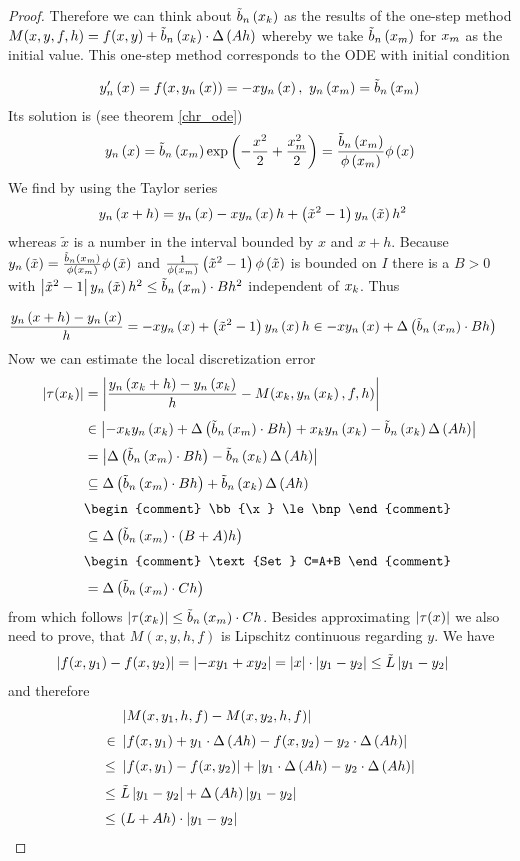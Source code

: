 \begin{proof}
  Therefore we can think about $\bb{\x}$ as the results of the one-step method $M(x,y,f,h)=f(x,y)+\bb{\x} \cdot \bigabs{A h}$ whereby we take $\bnp$ for $\xnp$ as the initial value. This one-step method corresponds to the ODE with initial condition

  \begin{align}
    \dphin{x}=f(x,\phin{x})=-x\phin{x},\ \phin{\xnp} = \bb{\xnp}
  \end{align}
  Its solution is (see theorem \ref{chr_ode})
  \begin{align}
    \phin{x} = \bb{\xnp}\fexp{-\frac{x^2}2+\frac{\xnp^2}2} = \frac{\bb{\xnp}}{\fphi{\xnp}} \fphi{x}
  \end{align}
  We find by using the Taylor series
  \begin{align}
    & \phin{x+h} = \phin{x} -x\phin{x}h+\br{\tilde x^2-1}\phin{\tilde x} h^2
  \end{align}
  whereas $\tilde x$ is a number in the interval bounded by $x$ and $x+h$. Because $\phin{\tilde x} = \frac{\bnp}{\fphi{\xnp}} \fphi{\tilde x}$ and $\frac{1}{\fphi{\xnp}} \br{\tilde x^2-1} \fphi{\tilde x}$ is bounded on $I$ there is a $B > 0$ with $\abs{\tilde x^2-1} \phin{\tilde x} h^2 \le \bnp \cdot B h^2$ independent of $\x[k]$. Thus

  \begin{align}
    \frac{\phin{x+h}-\phin{x}}h &= -x\phin{x}+\br{\tilde x^2-1}\phin{x} h \in -x\phin{x} + \bigabs{\bnp \cdot Bh}
  \end{align}
  Now we can estimate the local discretization error
  \begin{align}
    \abs{\tau(\x)} &= \abs{\frac{\phin{\x[k]+h}-\phin{\x}}h -  M(\x,\phin{\x},f,h)} \nl
    &\in \abs{-\x\phin{\x} + \bigabs{\bnp \cdot Bh} +\x\phin{\x} - \bb{\x} \bigabs{Ah}} \nl
    &= \abs{\bigabs{\bnp \cdot Bh}-\bb{\x} \bigabs{Ah}} \nl
    &\subseteq \bigabs{\bnp \cdot Bh}+ \bb{\x} \bigabs{Ah} \nl
    &
    \begin{comment}
      \bb{\x} \le \bnp
    \end{comment} \nl
    &\subseteq \bigabs{\bnp \cdot (B+A)h} \nl
    &
    \begin{comment}
      \text{Set } C=A+B
    \end{comment} \nl
    &= \bigabs{\bnp \cdot Ch}
  \end{align}
  from which follows $\abs{\tau(\x)} \le \bnp \cdot Ch$. Besides approximating $\abs{\tau(x)}$ we also need to prove, that $M(x,y,h,f)$ is Lipschitz continuous regarding $y$. We have
  \begin{align}
    \abs{f(x,y_1)-f(x,y_2)} &= \abs{-xy_1+xy_2} = \abs{x} \cdot \abs{y_1-y_2} \le \Lt \abs{y_1-y_2}
  \end{align}
  and therefore
  \begin{align}
    & \abs{M(x,y_1,h,f)-M(x,y_2,h,f)} \nl
    \in\ &  \abs{f(x,y_1)+y_1 \cdot \bigabs{Ah} - f(x,y_2)-y_2 \cdot \bigabs{A h}} \nl
    \le\ & \abs{f(x,y_1)-f(x,y_2)} + \abs{y_1 \cdot \bigabs{Ah}-y_2 \cdot \bigabs{Ah}} \nl
    \le\ & \Lt \abs{y_1-y_2} + \bigabs{Ah} \abs{y_1-y_2} \nl
    \le\ & (L+Ah)\cdot \abs{y_1-y_2}
  \end{align}


\end{proof}
